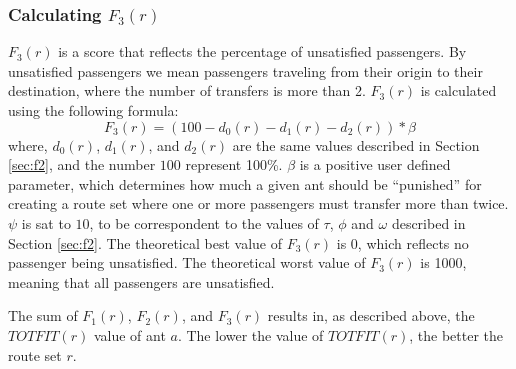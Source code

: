 \subsubsection{Calculating $F_{3}(r)$}
\label{sec:f3}
$F_3(r)$ is a score that reflects the percentage of unsatisfied passengers. By unsatisfied passengers we mean passengers traveling from their origin to their destination, where the number of transfers is more than 2. $F_3(r)$ is calculated using the following formula:
\newline
$$F_3(r) = (100 - d_0(r) - d_1(r) - d_2(r))*\beta$$
\newline
where, $d_0(r)$, $d_1(r)$, and $d_2(r)$ are the same values described in Section \vref{sec:f2}, and the number $100$ represent 100\%. $\beta$ is a positive user defined parameter, which determines how much a given ant should be ``punished'' for creating a route set where one or more passengers must transfer more than twice. $\psi$ is sat to $10$, to be correspondent to the values of $\tau$, $\phi$ and $\omega$ described in Section \vref{sec:f2}. The theoretical best value of $F_3(r)$ is 0, which reflects no passenger being unsatisfied. The theoretical worst value of $F_3(r)$ is 1000, meaning that all passengers are unsatisfied.

The sum of $F_{1}(r)$, $F_{2}(r)$, and $F_{3}(r)$ results in, as described above, the $TOTFIT(r)$ value of ant $a$. The lower the value of $TOTFIT(r)$, the better the route set $r$. 

